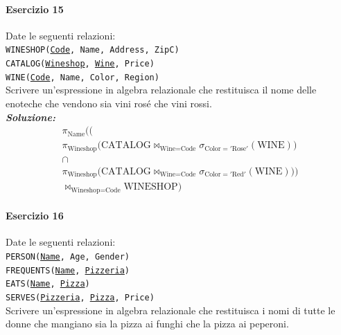 \documentclass[12pt]{extarticle}
\begin{document}
\vspace{1em}

\paragraph{Esercizio 15} Date le seguenti relazioni:\\

\noindent \texttt{WINESHOP(\underline{Code}, Name, Address, ZipC)}\\
\texttt{CATALOG(\underline{Wineshop}, \underline{Wine}, Price)}\\
\texttt{WINE(\underline{Code}, Name, Color, Region)}\\[0.5em]

\noindent Scrivere un'espressione in algebra relazionale che restituisca il nome delle enoteche che vendono sia vini rosé che vini rossi.\\

\noindent \textbf{\textit{Soluzione:}}
\[
\begin{gathered}
\pi_{\text{Name}} \Big( \Big( \\
\pi_{\text{Wineshop}} \big( \text{CATALOG} \bowtie_{\text{Wine} = \text{Code}} \sigma_{\text{Color} = '\text{Rose}'}(\text{WINE}) \big) \\
\cap \\
\pi_{\text{Wineshop}} \big( \text{CATALOG} \bowtie_{\text{Wine} = \text{Code}} \sigma_{\text{Color} = '\text{Red}'}(\text{WINE}) \big) \Big) \\
\bowtie_{\text{Wineshop} = \text{Code}} \text{WINESHOP} \Big)
\end{gathered}
\]

\vspace{1em}

\paragraph{Esercizio 16} Date le seguenti relazioni:\\

\noindent \texttt{PERSON(\underline{Name}, Age, Gender)}\\
\texttt{FREQUENTS(\underline{Name}, \underline{Pizzeria})}\\
\texttt{EATS(\underline{Name}, \underline{Pizza})}\\
\texttt{SERVES(\underline{Pizzeria}, \underline{Pizza}, Price)}\\[0.5em]

\noindent Scrivere un'espressione in algebra relazionale che restituisca i nomi di tutte le donne che mangiano sia la pizza ai funghi che la pizza ai peperoni.\\
\end{document}
